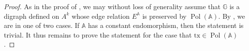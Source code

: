\documentclass[a4paper,reqno, cleveref]{amsart}
\DeclareMathOperator{\Pol}{Pol}
\DeclareMathOperator{\pr}{pr}
\DeclareMathOperator{\Aut}{Aut}
\newcommand{\sA}{\mathbb A}
\newcommand{\sB}{\mathbb B}
\newcommand{\sG}{\mathbb G}
\newcommand{\tx}{\ensuremath{\mathrm{tx}}\xspace}
\newcommand{\johanna}[1]{\todo{\textbf{Johanna:} #1}}
\newcommand\jo[1]{\textcolor{black}{#1}} %
\begin{document}
\begin{proof}%
   As in the proof of , we may without loss of generality assume that $\sG$ is a digraph defined on $A^k$ whose edge relation $E^{\sA}$ is preserved by $\Pol(\sA)$. 
   By , we are in one of two cases. If $\sA$ has a constant endomorphism, then the statement is trivial.
   It thus remains to prove the statement for the case that $\tx\in\Pol(\sA)$.
   
   


   

\end{proof}
\end{document}
